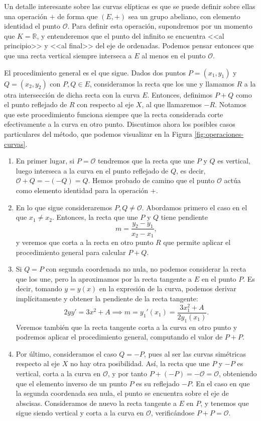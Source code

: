 \documentclass[
  a4paper,
  12pt,
  spanish,
]{scrartcl}
\begin{document}
Un detalle interesante sobre las curvas elípticas es que se puede definir sobre ellas una operación $+$ de forma que $(E, +)$ sea un grupo abeliano, con elemento identidad el punto $\mathcal{O}$. Para definir esta operación, supondremos por un momento que $K = \mathbb{R}$, y entenderemos que el punto del infinito se encuentra <<al principio>> y <<al final>> del eje de ordenadas.
Podemos pensar entonces que que una recta vertical siempre interseca a $E$ al menos en el punto \(\mathcal{O}\).

El procedimiento general es el que sigue. Dados dos puntos $P = (x_1, y_1)$ y $Q = (x_2, y_2)$ con $P,Q \in E$, consideramos la recta que los une y llamamos $R$ a la otra intersección de dicha recta con la curva $E$. Entonces, definimos $P + Q$ como el punto reflejado de $R$ con respecto al eje $X$, al que llamaremos $-R$. Notamos que este procedimiento funciona siempre que la recta considerada corte efectivamente a la curva en otro punto. Discutimos ahora los posibles casos particulares del método, que podemos visualizar en la Figura \ref{fig:operaciones-curvas}.

\begin{enumerate}
  \item En primer lugar, si $P=\mathcal{O}$ tendremos que la recta que une $P$ y $Q$ es vertical, luego interseca a la curva en el punto reflejado de $Q$, es decir, $\mathcal{O} + Q = - (-Q) = Q$. Hemos probado de camino que el punto $\mathcal{O}$ actúa como elemento identidad para la operación $+$.
  \item En lo que sigue consideraremos $P, Q \neq \mathcal{O}$. Abordamos primero el caso en el que $x_1 \neq x_2$. Entonces, la recta que une $P$ y $Q$ tiene pendiente \[ m = \frac{y_2 - y_1}{x_2 - x_1}, \] y veremos que corta a la recta en otro punto $R$ que permite aplicar el procedimiento general para calcular $P+Q$.
  \item Si $Q = P$ con segunda coordenada no nula, no podemos considerar la recta que los une, pero la aproximamos por la recta tangente a $E$ en el punto $P$. Es decir, tomando $y = y(x)$ en la expresión de la curva, podemos derivar implícitamente y obtener la pendiente de la recta tangente: \[ 2yy' = 3x^2 + A \implies m = y_1'(x_1) = \frac{3x_1^2 + A}{2y_1(x_1)}. \]  Veremos también que la recta tangente corta a la curva en otro punto y podremos aplicar el procedimiento general, computando el valor de $P + P$.
  \item Por último, consideramos el caso $Q = -P$, pues al ser las curvas simétricas respecto al eje $X$ no hay otra posibilidad. Así, la recta que une $P$ y $-P$ es vertical, corta a la curva en $\mathcal{O}$, y por tanto $P + (-P) = -\mathcal{O} = \mathcal{O}$, obteniendo que el elemento inverso de un punto $P$ es su reflejado $-P$. En el caso en que la segunda coordenada sea nula, el punto se encuentra sobre el eje de abscisas. Consideramos de nuevo la recta tangente a $E$ en $P$, y tenemos que sigue siendo vertical y corta a la curva en $\mathcal{O}$, verificándose $P + P = \mathcal{O}$.
\end{enumerate}
\end{document}
